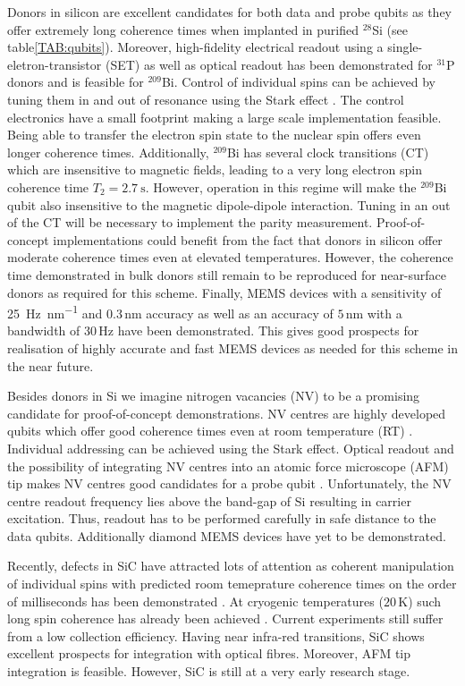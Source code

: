 Donors in silicon are excellent candidates for both data and probe qubits as they offer extremely long coherence times when implanted in purified $^{28}$Si (see table\@ \ref{TAB:qubits}). Moreover, high-fidelity electrical readout using a single-eletron-transistor (SET) \cite{Pla2012,Pla2013,Muhonen2014} as well as optical \cite{Lo2015} readout has been demonstrated for $^{31}$P donors and is feasible for $^{209}$Bi. Control of individual spins can be achieved by tuning them in and out of resonance using the Stark effect \cite{Pica2014}. The control electronics have a small footprint making a large scale implementation feasible. Being able to transfer the electron spin state to the nuclear spin offers even longer coherence times. Additionally, $^{209}$Bi has several clock transitions (CT) which are insensitive to magnetic fields, leading to a very long electron spin coherence time $T_2=\SI{2.7}{\second}$. However, operation in this regime will make the $^{209}$Bi qubit also insensitive to the magnetic dipole-dipole interaction. Tuning in an out of the CT will be necessary to implement the parity measurement. Proof-of-concept implementations could benefit from the fact that donors in silicon offer moderate coherence times even at elevated temperatures. However, the coherence time demonstrated in bulk donors still remain to be reproduced for near-surface donors as required for this scheme.
Finally, MEMS devices with a sensitivity of \SI{25}{\hertz\per nm} and $0.3\, $nm accuracy \cite{Chu2003} as well as an accuracy of $5\, $nm with a bandwidth of $30\, $Hz have been demonstrated. This gives good prospects for realisation of highly accurate and fast MEMS devices as needed for this scheme in the near future. 


Besides donors in Si we imagine nitrogen vacancies (NV) to be a promising candidate for proof-of-concept demonstrations. NV centres are highly developed qubits \cite{Bar-Gill2013} which offer good coherence times even at room temperature (RT) \cite{Balasubramanian2009}. Individual addressing can be achieved using the Stark effect. Optical readout and the possibility of integrating NV centres into an atomic force microscope (AFM) tip makes NV centres good candidates for a probe qubit \cite{Grinolds2013}. Unfortunately, the NV centre readout frequency lies above the band-gap of Si resulting in carrier excitation. Thus, readout has to be performed carefully in safe distance to the data qubits. Additionally diamond MEMS devices have yet to be demonstrated.

Recently, defects in SiC have attracted lots of attention \cite{Morello2015} as coherent manipulation of individual spins with predicted room temeprature coherence times on the order of milliseconds has been demonstrated \cite{Widmann2014}. At cryogenic temperatures ($20\, $K) such long spin coherence has already been achieved \cite{Christle2014}. Current experiments still suffer from a low collection efficiency. Having near infra-red transitions, SiC shows excellent prospects for integration with optical fibres. Moreover, AFM tip integration is feasible. However, SiC is still at a very early research stage.  


